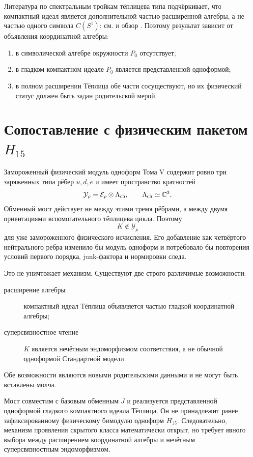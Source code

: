 Литература по спектральным тройкам тёплицева типа подчёркивает, что
компактный идеал является дополнительной частью расширенной алгебры, а не
частью одного символа $C(S^1)$; см.  и обзор
. Поэтому результат зависит от объявления
координатной алгебры:
\begin{enumerate}
 \item в символической алгебре окружности $P_0$ отсутствует;
 \item в гладком компактном идеале $P_0$ является представленной
 одноформой;
 \item в полном расширении Тёплица обе части сосуществуют, но их физический
 статус должен быть задан родительской мерой.
\end{enumerate}

\section{Сопоставление с физическим пакетом \texorpdfstring{$H_{15}$}{H15}}

Замороженный физический модуль одноформ Тома V содержит ровно три
заряженных типа рёбер $u,d,e$ и имеет пространство кратностей
\begin{equation}
 \mathcal Y_\rho=\mathcal E_\rho\otimes\Lambda_{\rm ch},
 \qquad \Lambda_{\rm ch}\simeq\mathbb C^3.
\end{equation}
Обменный мост действует не между этими тремя рёбрами, а между двумя
ориентациями вспомогательного тёплицева цикла. Поэтому
\begin{equation}
 K\notin\mathcal Y_\rho
\end{equation}
для уже замороженного физического исчисления. Его добавление как четвёртого
нейтрального ребра изменило бы модуль одноформ и потребовало бы повторения
условий первого порядка, junk-фактора и нормировки следа.

Это не уничтожает механизм. Существуют две строго различимые возможности:
\begin{description}
 \item[расширение алгебры] компактный идеал Тёплица объявляется частью
 гладкой координатной алгебры;
 \item[суперсвязностное чтение] $K$ является нечётным эндоморфизмом
 соответствия, а не обычной одноформой Стандартной модели.
\end{description}
Обе возможности являются новыми родительскими данными и не могут быть
вставлены молча.

\begin{theorem}
Мост совместим с базовым обменным $J$ и реализуется представленной
одноформой гладкого компактного идеала Тёплица. Он не принадлежит ранее
зафиксированному физическому бимодулю одноформ $H_{15}$. Следовательно,
механизм проявления скрытого класса математически открыт, но требует
явного выбора между расширением координатной алгебры и нечётным
суперсвязностным эндоморфизмом.
\end{theorem}

